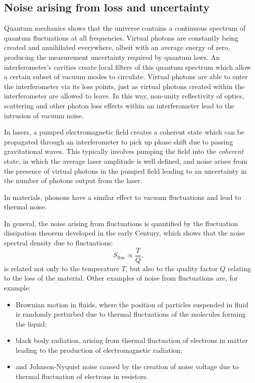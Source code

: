 \subsection{\label{sec:noise-via-loss}Noise arising from loss and uncertainty}
Quantum mechanics shows that the universe contains a continuous spectrum of quantum fluctuations at all frequencies. Virtual photons are constantly being created and annihilated everywhere, albeit with an average energy of zero, producing the measurement uncertainty required by quantum laws. An interferometer's cavities create local filters of this quantum spectrum which allow a certain subset of vacuum modes to circulate. Virtual photons are able to enter the interferometer via its loss points, just as virtual photons created within the interferometer are allowed to leave. In this way, non-unity reflectivity of optics, scattering and other photon loss effects within an interferometer lead to the intrusion of vacuum noise.

In lasers, a pumped electromagnetic field creates a coherent state which can be propagated through an interferometer to pick up phase shift due to passing gravitational waves. This typically involves pumping the field into the \emph{coherent} state, in which the average laser amplitude is well defined, and noise arises from the presence of virtual photons in the pumped field leading to an uncertainty in the number of photons output from the laser.

In materials, phonons  have a similar effect to vacuum fluctuations and lead to thermal noise.

In general, the noise arising from fluctuations is quantified by the fluctuation dissipation theorem developed in the early  Century, which shows that the noise spectral density due to fluctuations:
\begin{equation}
  S_{\text{fluc}} \propto \frac{T}{Q},
\end{equation}
is related not only to the temperature $T$, but also to the quality factor $Q$ relating to the loss of the material. Other examples of noise from fluctuations are, for example:
\begin{itemize}
  \item Brownian motion in fluids, where the position of particles suspended in fluid is randomly perturbed due to thermal fluctuations of the molecules forming the liquid;
  \item black body radiation, arising from thermal fluctuation of electrons in matter leading to the production of electromagnetic radiation;
  \item and Johnson-Nyquist noise caused by the creation of noise voltage due to thermal fluctuation of electrons in resistors.
\end{itemize}

